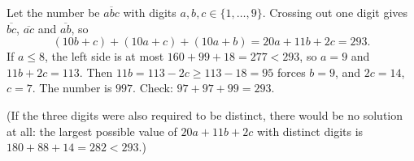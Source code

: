 Let the number be $\overline{abc}$ with digits $a,b,c\in\{1,\dots,9\}$. Crossing out one digit gives $\overline{bc}$, $\overline{ac}$ and $\overline{ab}$, so
\[
(10b+c)+(10a+c)+(10a+b)=20a+11b+2c=293 .
\]
If $a\le8$, the left side is at most $160+99+18=277<293$, so $a=9$ and $11b+2c=113$. Then $11b=113-2c\ge113-18=95$ forces $b=9$, and $2c=14$, $c=7$. The number is $\boxed{997}$. Check: $97+97+99=293$.

(If the three digits were also required to be distinct, there would be no solution at all: the largest possible value of $20a+11b+2c$ with distinct digits is $180+88+14=282<293$.)
